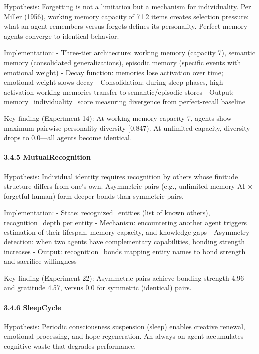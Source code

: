 \documentclass[
]{article}
\begin{document}
Hypothesis: Forgetting is not a limitation but a mechanism for
individuality. Per Miller (1956), working memory capacity of 7±2 items
creates selection pressure: what an agent remembers versus forgets
defines its personality. Perfect-memory agents converge to identical
behavior.

Implementation: - Three-tier architecture: working memory (capacity 7),
semantic memory (consolidated generalizations), episodic memory
(specific events with emotional weight) - Decay function: memories lose
activation over time; emotional weight slows decay - Consolidation:
during sleep phases, high-activation working memories transfer to
semantic/episodic stores - Output: memory\_individuality\_score
measuring divergence from perfect-recall baseline

Key finding (Experiment 14): At working memory capacity 7, agents show
maximum pairwise personality diversity (0.847). At unlimited capacity,
diversity drops to 0.0---all agents become identical.

\hypertarget{mutualrecognition}{%
\paragraph{3.4.5 MutualRecognition}\label{mutualrecognition}}

Hypothesis: Individual identity requires recognition by others whose
finitude structure differs from one's own. Asymmetric pairs (e.g.,
unlimited-memory AI × forgetful human) form deeper bonds than symmetric
pairs.

Implementation: - State: recognized\_entities (list of known others),
recognition\_depth per entity - Mechanism: encountering another agent
triggers estimation of their lifespan, memory capacity, and knowledge
gaps - Asymmetry detection: when two agents have complementary
capabilities, bonding strength increases - Output: recognition\_bonds
mapping entity names to bond strength and sacrifice willingness

Key finding (Experiment 22): Asymmetric pairs achieve bonding strength
4.96 and gratitude 4.57, versus 0.0 for symmetric (identical) pairs.

\hypertarget{sleepcycle}{%
\paragraph{3.4.6 SleepCycle}\label{sleepcycle}}

Hypothesis: Periodic consciousness suspension (sleep) enables creative
renewal, emotional processing, and hope regeneration. An always-on agent
accumulates cognitive waste that degrades performance.
\end{document}
